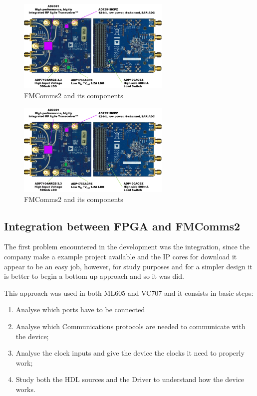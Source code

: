 \begin{figure}[htbp]
    \centering
    \includegraphics[width=0.65\textwidth]{./figures/fmcomms2_pic}
    \caption{ FMComms2 and its components
    \label{fig:fmcomm}}
\end{figure}

\begin{figure}[htbp]
    \centering
    \includegraphics[width=0.65\textwidth]{./figures/fmcomms2_pic}
    \caption{ FMComms2 and its components
    \label{fig:fmcomm}}
\end{figure}

\subsection{Integration between FPGA and FMComms2}

The first problem encountered in the development was the integration, since the
company make a example project available and the IP cores for download it appear
to be an easy job, however, for study purposes and for a simpler design it is
better to begin a bottom up approach and so it was did.

This approach was used in both ML605 and VC707 and it consists in basic steps:

\begin{enumerate}
    \item Analyse which ports have to be connected
    \item Analyse which Communications protocols are needed to communicate with the device;
    \item Analyse the clock inputs and give the device the clocks it need to properly work;
    \item Study both the HDL sources and the Driver to understand how the device works.
\end{enumerate}

